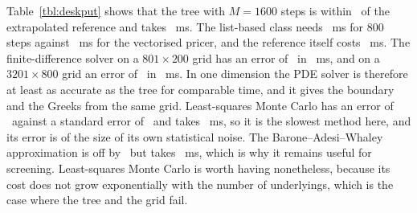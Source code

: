 Table~\ref{tbl:deskput} shows that the tree with $M=1600$ steps is within \DeskPutTreeErr\ of the extrapolated reference and takes \DeskPutTreeMs\ ms.
The list-based class needs \DeskPutClassMs\ ms for $800$ steps against \DeskPutVecMs\ ms for the vectorised pricer, and the reference itself costs \DeskPutRefMs\ ms.
The finite-difference solver on a $801\times200$ grid has an error of \DeskPdeCoarseErr\ in \DeskPdeCoarseMs\ ms, and on a $3201\times800$ grid an error of \DeskPdeFineErr\ in \DeskPdeFineMs\ ms.
In one dimension the PDE solver is therefore at least as accurate as the tree for comparable time, and it gives the boundary and the Greeks from the same grid.
Least-squares Monte Carlo has an error of \DeskLsmErr\ against a standard error of \DeskLsmSE\ and takes \DeskLsmMs\ ms, so it is the slowest method here, and its error is of the size of its own statistical noise.
The Barone--Adesi--Whaley approximation is off by \DeskBawErr\ but takes \DeskBawMs\ ms, which is why it remains useful for screening.
Least-squares Monte Carlo is worth having nonetheless, because its cost does not grow exponentially with the number of underlyings, which is the case where the tree and the grid fail.
